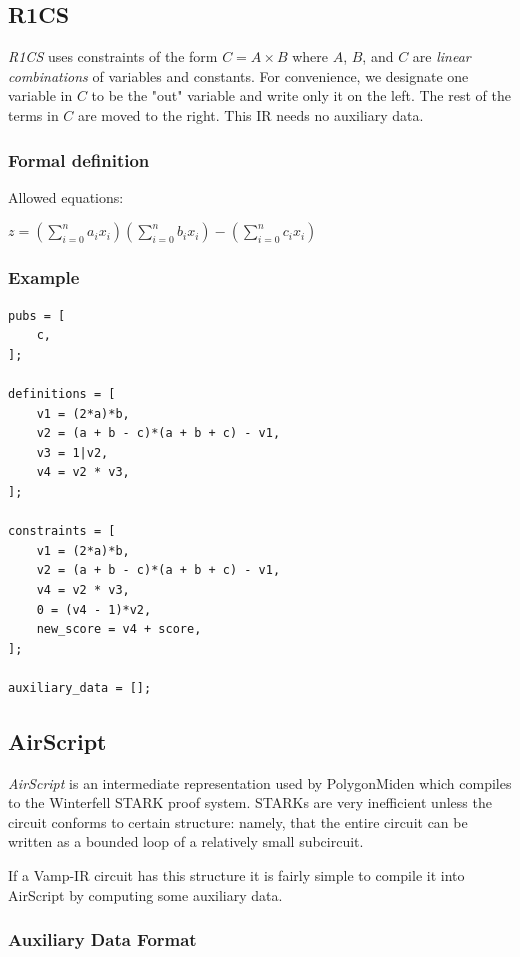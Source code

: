 \documentclass[
    9pt,            %
    techreport,        %
    affiltop,       %
]{art}
\begin{document}
\subsection{R1CS}

\emph{R1CS} uses constraints of the form $C = A\times B$ where $A$, $B$, and $C$ are \textit{linear combinations} of variables and constants. For convenience, we designate one variable in $C$ to be the "out" variable and write only it on the left. The rest of the terms in $C$ are moved to the right. This IR needs no auxiliary data.

\subsubsection{Formal definition}
Allowed equations:

$\displaystyle z = \left(\sum_{i=0}^n a_i x_i\right)\left(\sum_{i=0}^n b_i x_i\right) - \left(\sum_{i=0}^n c_i x_i\right)$


\subsubsection{Example}

\begin{verbatim}
pubs = [
    c,
];

definitions = [
    v1 = (2*a)*b,
    v2 = (a + b - c)*(a + b + c) - v1,
    v3 = 1|v2,
    v4 = v2 * v3,   
];

constraints = [
    v1 = (2*a)*b,
    v2 = (a + b - c)*(a + b + c) - v1,
    v4 = v2 * v3,
    0 = (v4 - 1)*v2,
    new_score = v4 + score,
];

auxiliary_data = [];
\end{verbatim}

\subsection{AirScript}

\emph{AirScript} is an intermediate representation used by PolygonMiden which compiles to the Winterfell STARK proof system. STARKs are very inefficient unless the circuit conforms to certain structure: namely, that the entire circuit can be written as a bounded loop of a relatively small subcircuit.

If a Vamp-IR circuit has this structure it is fairly simple to compile it into AirScript by computing some auxiliary data.

\subsubsection{Auxiliary Data Format}
\end{document}
